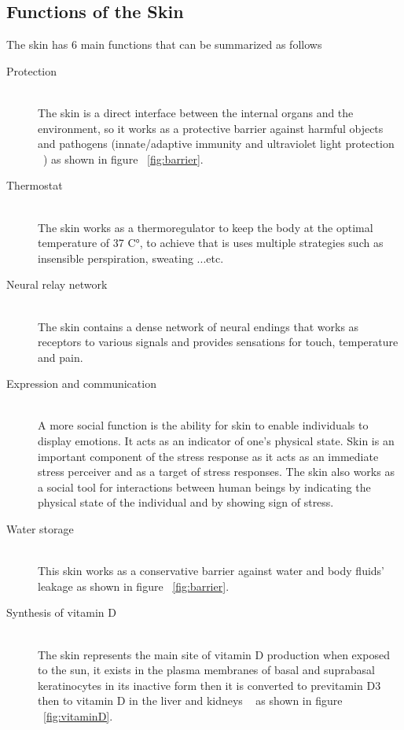 \subsection{Functions of the Skin}
The skin has 6 main functions that can be summarized as follows~\cite{sarah2021}
\begin{description}
\item[Protection] \hfill \\
            The skin is a direct interface between the internal organs and the environment, so it works as a protective barrier against harmful objects and pathogens (innate/adaptive immunity and ultraviolet light protection  ~\cite{joseph2020}) as shown in figure ~\ref{fig:barrier}.
            
\item[Thermostat] \hfill \\
            The skin works as a thermoregulator to keep the body at the optimal temperature of 37 C°, to achieve that is uses multiple strategies such as insensible perspiration, sweating ...etc.
\item[Neural relay network] \hfill \\
            The skin contains a dense network of neural endings that works as receptors to various signals and provides sensations for touch, temperature and pain.
\item[Expression and communication] \hfill \\
            A more social function
            is the ability for skin to enable individuals to display
            emotions. It acts as an indicator of one’s physical state.
            Skin is an important component of the stress response as it
            acts as an immediate stress perceiver and as a target of
            stress responses.
            The skin also works as a social tool for interactions between human beings by indicating the physical state of the individual and by showing sign of stress.
\item[Water storage] \hfill \\
            This skin works as a conservative barrier against water and body fluids' leakage as shown in figure ~\ref{fig:barrier}.
\item[Synthesis of vitamin D] \hfill \\
            The skin represents the main site of vitamin D production when exposed to the sun, it exists in the plasma membranes of basal and suprabasal keratinocytes in its inactive form then it is converted to previtamin D3 then to vitamin D in the liver and kidneys  ~\cite{joseph2020} as shown in figure ~\ref{fig:vitaminD}.
\end{description}
